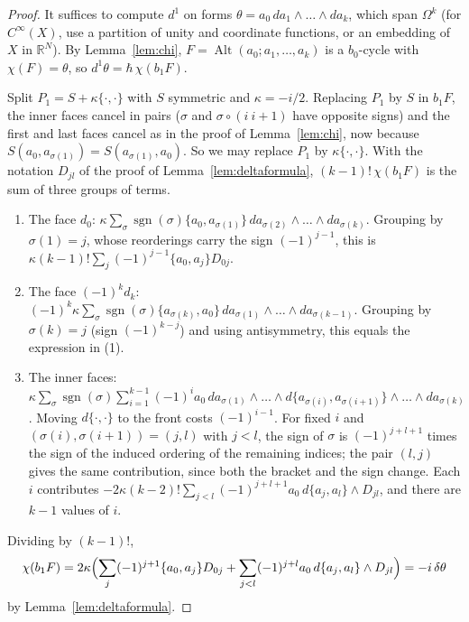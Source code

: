 \documentclass[11pt,oneside,reqno]{article}
\DeclareMathOperator{\sgn}{sgn}
\newcommand{\R}{\mathbb R}
\newcommand{\CI}{C^\infty}
\newcommand{\Om}{\Omega}
\newcommand{\hb}{\hbar}
\theoremstyle{plain}
\theoremstyle{definition}
\theoremstyle{remark}
\begin{document}
\begin{proof}
It suffices to compute \(d^1\) on forms \(\theta=a_0\,da_1\wedge\dots\wedge da_k\), which
span \(\Om^k\) (for \(\CI(X)\), use a partition of unity and coordinate functions,
or an embedding of \(X\) in \(\R^N\)). By Lemma~\ref{lem:chi},
\(F=\operatorname{Alt}(a_0;a_1,\dots,a_k)\) is a \(b_0\)-cycle with \(\chi(F)=\theta\), so
\(d^1\theta=\hb\,\chi(b_1F)\).

Split \(P_1=S+\kappa\{\cdot,\cdot\}\) with \(S\) symmetric and \(\kappa=-i/2\).
Replacing \(P_1\) by \(S\) in \(b_1F\), the inner faces cancel in pairs (\(\sigma\) and
\(\sigma\circ(i\ i{+}1)\) have opposite signs) and the first and last faces cancel as
in the proof of Lemma~\ref{lem:chi}, now because
\(S(a_0,a_{\sigma(1)})=S(a_{\sigma(1)},a_0)\). So we may replace \(P_1\) by
\(\kappa\{\cdot,\cdot\}\). With the notation \(D_{jl}\) of the proof of
Lemma~\ref{lem:deltaformula}, \((k-1)!\,\chi(b_1F)\) is the sum of three
groups of terms.
\begin{enumerate}
\item The face \(d_0\): \(\kappa\sum_\sigma\sgn(\sigma)\{a_0,a_{\sigma(1)}\}\,
da_{\sigma(2)}\wedge\dots\wedge da_{\sigma(k)}\). Grouping by \(\sigma(1)=j\), whose
reorderings carry the sign \((-1)^{j-1}\), this is
\(\kappa(k-1)!\sum_j(-1)^{j-1}\{a_0,a_j\}D_{0j}\).
\item The face \((-1)^kd_k\): \((-1)^k\kappa\sum_\sigma\sgn(\sigma)\{a_{\sigma(k)},a_0\}\,
da_{\sigma(1)}\wedge\dots\wedge da_{\sigma(k-1)}\). Grouping by \(\sigma(k)=j\) (sign
\((-1)^{k-j}\)) and using antisymmetry, this equals the expression in (1).
\item The inner faces: \(\kappa\sum_\sigma\sgn(\sigma)\sum_{i=1}^{k-1}(-1)^ia_0\,
da_{\sigma(1)}\wedge\dots\wedge d\{a_{\sigma(i)},a_{\sigma(i+1)}\}\wedge\dots\wedge
da_{\sigma(k)}\). Moving \(d\{\cdot,\cdot\}\) to the front costs \((-1)^{i-1}\). For fixed
\(i\) and \((\sigma(i),\sigma(i+1))=(j,l)\) with \(j<l\), the sign of \(\sigma\) is
\((-1)^{j+l+1}\) times the sign of the induced ordering of the remaining
indices; the pair \((l,j)\) gives the same contribution, since both the bracket
and the sign change. Each \(i\) contributes
\(-2\kappa(k-2)!\sum_{j<l}(-1)^{j+l+1}a_0\,d\{a_j,a_l\}\wedge D_{jl}\), and there are
\(k-1\) values of \(i\).
\end{enumerate}
Dividing by \((k-1)!\),
\[
 \chi(b_1F)=2\kappa\Bigl(\sum_j(-1)^{j+1}\{a_0,a_j\}D_{0j}+\sum_{j<l}(-1)^{j+l}a_0\,
 d\{a_j,a_l\}\wedge D_{jl}\Bigr)=-i\,\delta\theta
\]
by Lemma~\ref{lem:deltaformula}.
\end{proof}
\end{document}
